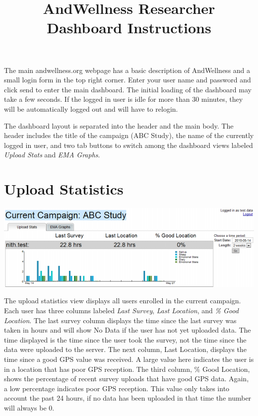 \documentclass{article}
\title{AndWellness Researcher Dashboard Instructions}
\begin{document}
\maketitle

The main andwellness.org webpage has a basic description of AndWellness and a small
login form in the top right corner.  Enter your user name
and password and click send to enter the main dashboard.  The initial loading of the dashboard may take a few seconds.
If the logged in user is idle for more than 30 minutes, they will be automatically logged out and will have to relogin.

The dashboard layout is separated into the header and the main body.
The header includes the title of the campaign (ABC Study), the
name of the currently logged in user, and two tab buttons to switch among the
dashboard views labeled \emph{Upload Stats} and \emph{EMA Graphs}.

\section*{Upload Statistics}
\begin{center}
	\includegraphics[width=6in]{dashboard-shrunk}
\end{center}

The upload statistics view displays all users enrolled in the current
campaign.  Each user has three columns labeled \emph{Last Survey},
\emph{Last Location}, and \emph{\% Good Location}.  The last survey column
displays the time since the last survey was taken in hours and
will show No Data if the user has not yet uploaded data.  The time displayed
is the time since the user took the survey, not the time since the data were uploaded to the server.
The next column, Last Location, displays the time since a good GPS value was received.  A large
value here indicates the user is in a location that has poor GPS reception.  The third column, \% Good Location,
shows the percentage of recent survey uploads that have good GPS data.  Again, a low percentage indicates
poor GPS reception.  This value only takes into account the past 24 hours, if no data has been uploaded in that
time the number will always be 0.
\end{document}
